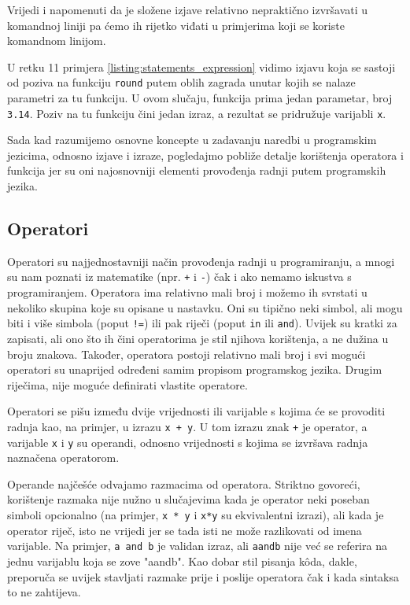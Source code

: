 Vrijedi i napomenuti da je složene izjave relativno nepraktično izvršavati u komandnoj liniji pa ćemo ih rijetko viđati u primjerima koji se koriste komandnom linijom.

U retku 11 primjera \ref{listing:statements_expression} vidimo izjavu koja se sastoji od poziva na funkciju \texttt{round} putem oblih zagrada unutar kojih se nalaze parametri za tu funkciju. U ovom slučaju, funkcija prima jedan parametar, broj \texttt{3.14}. Poziv na tu funkciju čini jedan izraz, a rezultat se pridružuje varijabli \texttt{x}.

Sada kad razumijemo osnovne koncepte u zadavanju naredbi u programskim jezicima, odnosno izjave i izraze, pogledajmo pobliže detalje korištenja operatora i funkcija jer su oni najosnovniji elementi provođenja radnji putem programskih jezika.


\subsection{Operatori}

Operatori su najjednostavniji način provođenja radnji u programiranju, a mnogi su nam poznati iz matematike (npr. \texttt{+} i \texttt{-}) čak i ako nemamo iskustva s programiranjem. Operatora ima relativno mali broj i možemo ih svrstati u nekoliko skupina koje su opisane u nastavku. Oni su tipično neki simbol, ali mogu biti i više simbola (poput \texttt{!=}) ili pak riječi (poput \texttt{in} ili \texttt{and}). Uvijek su kratki za zapisati, ali ono što ih čini operatorima je stil njihova korištenja, a ne dužina u broju znakova. Također, operatora postoji relativno mali broj i svi mogući operatori su unaprijed određeni samim propisom programskog jezika. Drugim riječima, nije moguće definirati vlastite operatore.

Operatori se pišu između dvije vrijednosti ili varijable s kojima će se provoditi radnja kao, na primjer, u izrazu \texttt{x + y}. U tom izrazu znak \texttt{+} je operator, a varijable \texttt{x} i \texttt{y} su operandi, odnosno vrijednosti s kojima se izvršava radnja naznačena operatorom.

Operande najčešće odvajamo razmacima od operatora. Striktno govoreći, korištenje razmaka nije nužno u slučajevima kada je operator neki poseban simboli opcionalno (na primjer, \texttt{x * y} i \texttt{x*y} su ekvivalentni izrazi), ali kada je operator riječ, isto ne vrijedi jer se tada isti ne može razlikovati od imena varijable. Na primjer, \texttt{a and b} je validan izraz, ali \texttt{aandb} nije već se referira na jednu varijablu koja se zove "aandb". Kao dobar stil pisanja kôda, dakle, preporuča se uvijek stavljati razmake prije i poslije operatora čak i kada sintaksa to ne zahtijeva.


